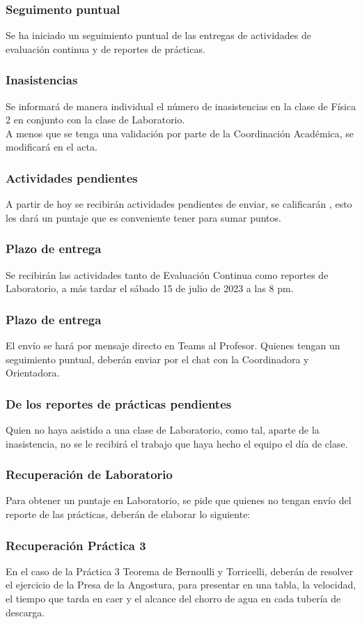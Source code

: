 \documentclass[14pt]{beamer}
\begin{document}
\begin{frame}
\frametitle{Seguimento puntual}
Se ha iniciado un seguimiento puntual de las entregas de actividades de evaluación continua y de reportes de prácticas.
\end{frame}
\begin{frame}
\frametitle{Inasistencias}
Se informará de manera individual el número de inasistencias en la clase de Física 2 en conjunto con la clase de Laboratorio.
\\
\bigskip
\pause
A menos que se tenga una validación por parte de la Coordinación Académica, se modificará en el acta.
\end{frame}
\begin{frame}
\frametitle{Actividades pendientes}
A partir de hoy se recibirán actividades pendientes de enviar, \pause se calificarán , esto les dará un puntaje que es conveniente tener para sumar puntos.
\end{frame}
\begin{frame}
\frametitle{Plazo de entrega}
Se recibirán las actividades tanto de Evaluación Continua como reportes de Laboratorio, a más tardar el sábado 15 de julio de 2023 a las 8 pm.
\end{frame}
\begin{frame}
\frametitle{Plazo de entrega}
El envío se hará por mensaje directo en Teams al Profesor. Quienes tengan un seguimiento puntual, deberán enviar por el chat con la Coordinadora y Orientadora.
\end{frame}
\begin{frame}
\frametitle{De los reportes de prácticas pendientes}
Quien no haya asistido a una clase de Laboratorio, como tal, aparte de la inasistencia, no se le recibirá el trabajo que haya hecho el equipo el día de clase.
\end{frame}
\begin{frame}
\frametitle{Recuperación de Laboratorio}
Para obtener un puntaje en Laboratorio, se pide que quienes no tengan envío del reporte de las prácticas, \pause deberán de elaborar lo siguiente:
\end{frame}
\begin{frame}
\frametitle{Recuperación Práctica 3}
En el caso de la Práctica 3 Teorema de Bernoulli y Torricelli, \pause deberán de resolver el ejercicio de la Presa de la Angostura, para presentar en una tabla, la velocidad, el tiempo que tarda en caer y el alcance del chorro de agua en cada tubería de descarga.
\end{frame}
\end{document}
